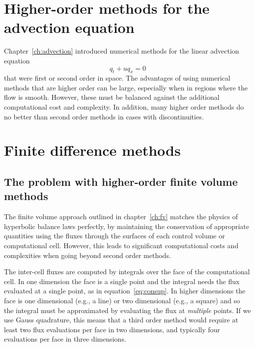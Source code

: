 \label{ch:higher-order-advection}


\section{Higher-order methods for the advection equation}
\label{sec:ho-intro}

Chapter~\ref{ch:advection} introduced numerical methods for the linear
advection equation
\begin{equation}
\label{eq:ho-advect}
q_t + u q_x = 0
\end{equation}
that were first or second order in space. The advantages of using numerical
methods that are higher order can be large, especially when in regions where
the flow is smooth. However, these must be balanced against the additional
computational cost and complexity. In addition, many higher order methods do no
better than second order methods in cases with discontinuities.

\section{Finite difference methods}
\label{sec:ho-fd}

\subsection{The problem with higher-order finite volume methods}

The finite volume approach outlined in chapter~\ref{ch:fv}
matches the physics of hyperbolic balance
laws perfectly, by maintaining the conservation of appropriate quantities using
the fluxes through the surfaces of each control volume or computational cell.
However, this leads to significant computational costs and complexities when
going beyond second order methods.

The inter-cell fluxes are computed by integrals over the face of the
computational cell. In one dimension the face is a single point and the
integral needs the flux evaluated at a single point, as in
equation~\ref{eq:consup}. In higher dimensions the face is one dimensional
(e.g., a line) or two dimensional (e.g., a square) and so the integral must be
approximated by evaluating the flux at \emph{multiple} points. If we use Gauss
quadrature, this means that a third order method would require at least two
flux evaluations per face in two dimensions, and typically four evaluations per
face in three dimensions.

